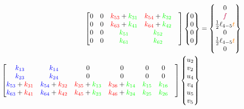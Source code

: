\begin{landscape}
\begin{align*}
\begin{bmatrix}
        0 & 0 &  \textcolor{red}{k_{53}} + \textcolor{green}{k_{31}} &  \textcolor{red}{k_{54}} + \textcolor{green}{k_{32}} & \\ 
        0 & 0 &  \textcolor{red}{k_{63}} + \textcolor{green}{k_{41}} &  \textcolor{red}{k_{64}} + \textcolor{green}{k_{42}} & \\ 
        0 & 0 &  \textcolor{green}{k_{51}} &  \textcolor{green}{k_{52}} & \\ 
        0 & 0 &  \textcolor{green}{k_{61}} &  \textcolor{green}{k_{62}} & \\ 
        \end{bmatrix}
        \begin{Bmatrix}
            0 \\ 0 \\ 0 \\ 0
        \end{Bmatrix} &=
        \begin{Bmatrix}
            0 \\ \textcolor{purple}{f} \\ \frac{1}{2} \ell_{4-5} \textcolor{orange}{t} \\ 0 \\ \frac{1}{2} \ell_{4-5} \textcolor{orange}{t} \\ 0
        \end{Bmatrix} \\
        \begin{bmatrix}
            \textcolor{blue}{k_{13}} &  \textcolor{blue}{k_{14}} & 0 & 0 & 0 & 0 & \\ 
            \textcolor{blue}{k_{23}} &  \textcolor{blue}{k_{24}} & 0 & 0 & 0 & 0 & \\ 
            \textcolor{blue}{k_{53}} + \textcolor{red}{k_{31}} &  \textcolor{blue}{k_{54}} + \textcolor{red}{k_{32}} &  \textcolor{red}{k_{35}} + \textcolor{green}{k_{13}} &  \textcolor{red}{k_{36}} + \textcolor{green}{k_{14}} &  \textcolor{green}{k_{15}} &  \textcolor{green}{k_{16}} & \\ 
            \textcolor{blue}{k_{63}} + \textcolor{red}{k_{41}} &  \textcolor{blue}{k_{64}} + \textcolor{red}{k_{42}} &  \textcolor{red}{k_{45}} + \textcolor{green}{k_{23}} &  \textcolor{red}{k_{46}} + \textcolor{green}{k_{24}} &  \textcolor{green}{k_{25}} &  \textcolor{green}{k_{26}} & \\ 
        \end{bmatrix} 
        \begin{Bmatrix}
            u_2 \\ v_2 \\ u_4 \\ v_4 \\ u_5 \\ v_5

\end{Bmatrix}
\end{align*}
\end{landscape}
